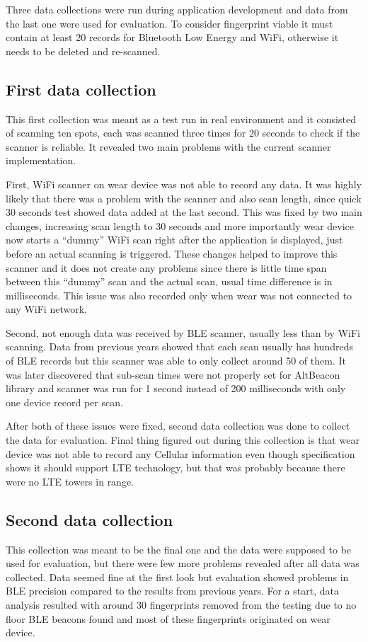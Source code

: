 Three data collections were run during application development and data from the last one were used for evaluation. To consider fingerprint viable it must contain at least 20 records for Bluetooth Low Energy and WiFi, otherwise it needs to be deleted and re-scanned.

\subsection{First data collection}\label{sec:FirstDataCollection}
This first collection was meant as a test run in real environment and it consisted of scanning ten spots, each was scanned three times for 20 seconds to check if the scanner is reliable. It revealed two main problems with the current scanner implementation.

First, WiFi scanner on wear device was not able to record any data. It was highly likely that there was a problem with the scanner and also scan length, since quick 30 seconds test showed data added at the last second. This was fixed by two main changes, increasing scan length to 30 seconds and more importantly wear device now starts a \enquote{dummy} WiFi scan right after the application is displayed, just before an actual scanning is triggered. These changes helped to improve this scanner and it does not create any problems since there is little time span between this \enquote{dummy} scan and the actual scan, usual time difference is in milliseconds. This issue was also recorded only when wear was not connected to any WiFi network.

Second, not enough data was received by BLE scanner, usually less than by WiFi scanning. Data from previous years showed that each scan usually has hundreds of BLE records but this scanner was able to only collect around 50 of them. It was later discovered that sub-scan times were not properly set for AltBeacon library and scanner was run for 1 second instead of 200 milliseconds with only one device record per scan.

After both of these issues were fixed, second data collection was done to collect the data for evaluation. Final thing figured out during this collection is that wear device was not able to record any Cellular information even though specification shows it should support LTE technology, but that was probably because there were no LTE towers in range. 

\subsection{Second data collection}\label{sec:SecondDataCollection}
This collection was meant to be the final one and the data were supposed to be used for evaluation, but there were few more problems revealed after all data was collected. Data seemed fine at the first look but evaluation showed problems in BLE precision compared to the results from previous years. For a start, data analysis resulted with around 30 fingerprints removed from the testing due to no floor BLE beacons found and most of these fingerprints originated on wear device.

